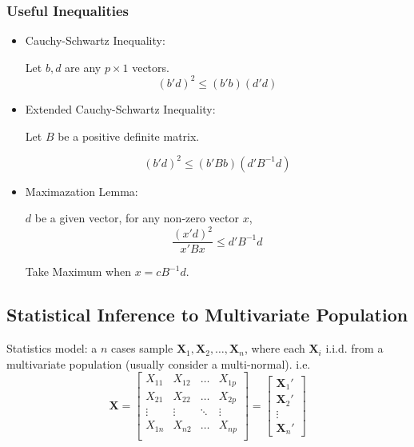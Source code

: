     \subsubsection{Useful Inequalities}
    \begin{itemize}[topsep=6pt,itemsep=4pt]
        \item Cauchy-Schwartz Inequality:
        
        Let $ b,d$ are any $ p\times 1 $ vectors.
        \[
            (b'd)^2\leq (b'b)(d'd) 
        \]
        
        \item Extended Cauchy-Schwartz Inequality: 
        
        Let $ B $ be a positive definite matrix.
        
        \[
            (b'd)^2\leq(b'Bb)(d'B^{-1}d) 
        \]
        
        \item Maximazation Lemma:
        
        $ d $ be a given vector, for any non-zero vector $ x $,
        \[
            \dfrac{(x'd)^2}{x'Bx}\leq d'B^{-1}d 
        \]

        Take Maximum when $ x=cB^{-1}d $.
        
        
    \end{itemize}

        

\subsection{Statistical Inference to Multivariate Population}
    Statistics model: a $ n $ cases sample $ \mathbf{X}_1,\mathbf{X}_2,\ldots,\mathbf{X}_n $, where each $ \mathbf{X}_i $ i.i.d. from a multivariate population (usually consider a multi-normal). i.e.
    \begin{equation}\label{EqaNPSampleMatrixNotation}
        \mathbf{X}=\begin{bmatrix}
            X_{11}&X_{12}&\ldots&X_{1p}\\
            X_{21}&X_{22}&\ldots&X_{2p}\\
            \vdots&\vdots&\ddots&\vdots\\
            X_{1n}&X_{n2}&\ldots&X_{np}\\
            \end{bmatrix} 
            =
            \begin{bmatrix}
                \mathbf{X}_1'\\
                \mathbf{X}_2'\\
                \vdots\\
                \mathbf{X}_n'
            \end{bmatrix}
    \end{equation}



